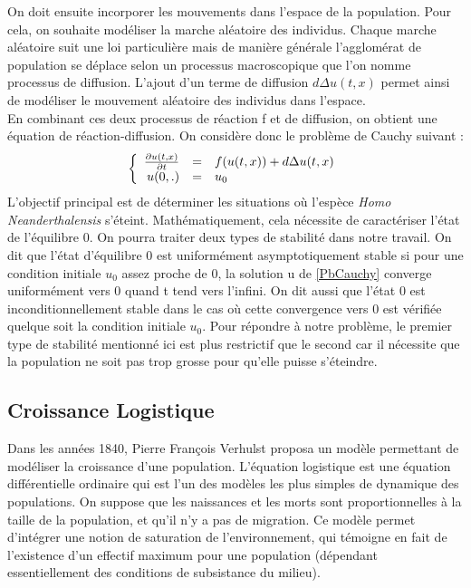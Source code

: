 \documentclass[a4paper,11pt]{article}
\begin{document}
On doit ensuite incorporer les mouvements dans l'espace de la population. Pour cela, on souhaite modéliser la marche aléatoire des individus. Chaque marche aléatoire suit une loi particulière mais de manière générale l'agglomérat de population se déplace selon un processus macroscopique que l'on nomme processus de diffusion.
L'ajout d'un terme de diffusion $d\Delta u(t,x)$ permet ainsi de modéliser le mouvement aléatoire des individus dans l'espace.\\
\newline
 En combinant ces deux processus de réaction f et  de  diffusion, on obtient une équation de réaction-diffusion.
On considère donc le problème de Cauchy suivant : 
\begin{equation}\label{PbCauchy}
\left\{
\begin{array}{r c l}
 \frac{\partial u(t,x)}{\partial t}&=&f(u(t,x))+d\Delta u(t,x)\\
u(0,.) &=& u_0\\
\end{array}
\right.
\end{equation}
L'objectif principal est de déterminer les situations où l'espèce \textit{Homo Neanderthalensis} s'éteint. Mathématiquement, cela nécessite de caractériser l'état de l'équilibre 0. On pourra traiter deux types de stabilité dans notre travail.
On dit que l'état d'équilibre 0 est uniformément asymptotiquement stable si pour une condition initiale $u_0$ assez proche de 0, la solution u de \ref{PbCauchy} converge uniformément vers 0 quand t tend vers l'infini. On dit aussi que l'état 0 est inconditionnellement stable dans le cas où cette convergence vers 0 est vérifiée quelque soit la condition initiale $u_0$. Pour répondre à notre problème, le premier type de stabilité mentionné ici est plus restrictif que le second car il nécessite que la population ne soit pas trop grosse pour qu'elle puisse s'éteindre.   



\subsection{Croissance Logistique}
Dans les années 1840, Pierre François Verhulst proposa un modèle permettant de modéliser la croissance d'une population. L'équation logistique est une équation différentielle ordinaire qui est l'un des modèles les plus simples de dynamique des populations. On suppose que les naissances et les morts sont proportionnelles à la taille de la population, et qu'il n'y a pas de migration. Ce modèle permet d'intégrer une notion de saturation de l'environnement, qui témoigne en fait de l'existence d'un effectif maximum pour une population (dépendant essentiellement des conditions de subsistance du milieu). 
\end{document}
